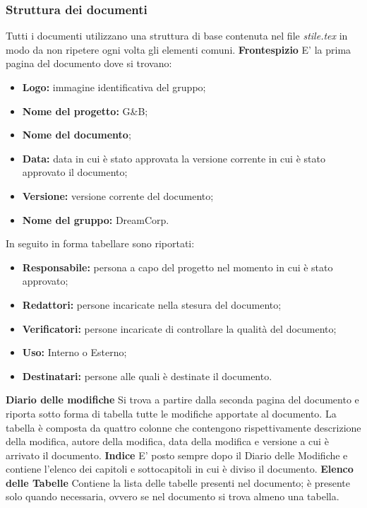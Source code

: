 		\subsubsection{Struttura dei documenti}
			Tutti i documenti utilizzano una struttura di base contenuta nel file \textit{stile.tex} in modo da non ripetere ogni volta gli elementi comuni.
			\newline \newline \textbf{Frontespizio} E' la prima pagina del documento dove si trovano:
			\begin{itemize}
				\item \textbf{Logo:} immagine identificativa del gruppo;
				\item \textbf{Nome del progetto:} G\&B;
				\item \textbf{Nome del documento};
				\item \textbf{Data:} data in cui è stato approvata la versione corrente in cui è stato approvato il documento;
				\item \textbf{Versione:} versione corrente del documento;
				\item \textbf{Nome del gruppo:} DreamCorp.
			\end{itemize}
			In seguito in forma tabellare sono riportati:
			\begin{itemize}
				\item \textbf{Responsabile:} persona a capo del progetto nel momento in cui è stato approvato;
				\item \textbf{Redattori:} persone incaricate nella stesura del documento;
				\item \textbf{Verificatori:} persone incaricate di controllare la qualità del documento;
				\item \textbf{Uso:} Interno o Esterno;
				\item \textbf{Destinatari:} persone alle quali è destinate il documento.
			\end{itemize}
		\textbf{Diario delle modifiche}  Si trova a partire dalla seconda pagina del documento e riporta sotto forma di tabella tutte le modifiche apportate al documento. La tabella è composta da quattro colonne che contengono rispettivamente descrizione della modifica, autore della modifica, data della modifica e versione a cui è arrivato il documento.
		\newline \newline \textbf{Indice}  E' posto sempre dopo il Diario delle Modifiche e contiene l'elenco dei capitoli e sottocapitoli in cui è diviso il documento.
		\newline \newline \textbf{Elenco delle Tabelle} Contiene la lista delle tabelle presenti nel documento; è presente solo quando necessaria, ovvero se nel documento si trova almeno una tabella.
